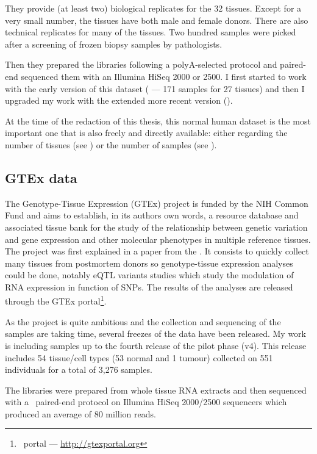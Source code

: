 They provide (at least two) biological replicates for the 32 tissues.
Except for a very small number, the tissues have both male and female donors.
There are also technical replicates for many of the tissues. Two hundred samples
were picked after a screening of frozen biopsy samples by pathologists.

Then they prepared the libraries following a polyA-selected protocol and
paired-end sequenced them with an Illumina HiSeq 2000 or 2500. I first started
to work with the early version of this dataset
( --- 171 samples for 27 tissues)
and then I upgraded my work with the extended more recent version
().

At the time of the redaction of this thesis, this normal human dataset is the
most important one that is also freely and directly available: either regarding
the number of tissues (see )
or the number of samples (see ).


\subsection{GTEx data}
\label{subsec:gtexPresentation}
The Genotype-Tissue Expression (\gls{GTEx}) project is funded by the \gls{NIH}
Common Fund and aims to establish, in its authors own words,
a resource database and associated tissue bank
for the study of the relationship between genetic variation and gene expression
and other molecular phenotypes in multiple reference tissues. The project was first
explained in a paper from the \cite{GTEx2013}. It consists to quickly collect
many tissues from postmortem donors so genotype-tissue expression analyses could
be done, notably \gls{eQTL} variants studies which study the modulation
of \gls{RNA} expression in function of \glspl{SNP}. The results of the
analyses are released through the GTEx portal\footnote{\Gtex\ portal --- %
\href{http://gtexportal.org}{http://gtexportal.org}}.

As the project is quite ambitious and the collection and sequencing of the samples
are taking time, several freezes of the data have been released. My work is
including samples up to the fourth release of the pilot phase (v4). This
release includes 54 tissue/cell types (53 normal and 1 tumour)
collected on 551 individuals for a total of 3,276 samples.

The libraries were prepared from whole tissue \gls{RNA} extracts and then
sequenced with a \mRNA\ paired-end protocol on Illumina HiSeq 2000/2500
sequencers which produced an average of 80 million reads.

